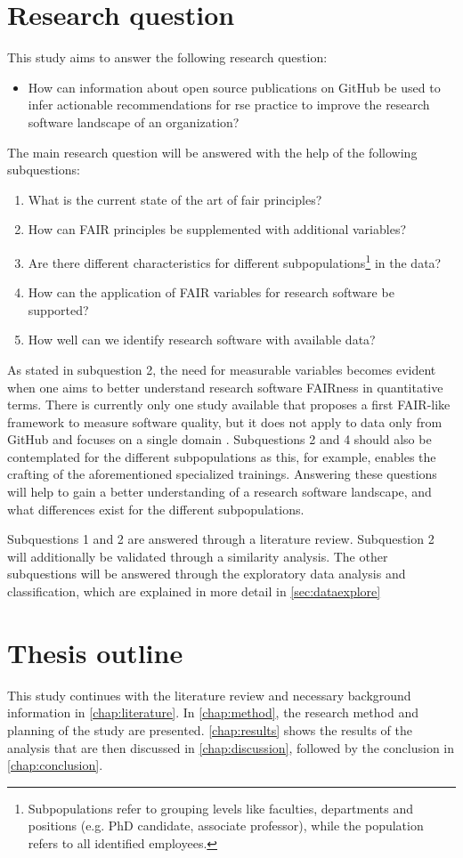 \section{Research question}
This study aims to answer the following research question: 
\begin{itemize}
    \item How can information about open source publications on GitHub be used to infer actionable recommendations for \acrshort{rse} practice to improve the research software landscape of an organization? 
\end{itemize}
The main research question will be answered with the help of the following subquestions:
\begin{enumerate}
  \item What is the current state of the art of \acrshort{fair} principles?
  \item How can FAIR principles be supplemented with additional variables?  
  \item Are there different characteristics for different subpopulations\footnote{Subpopulations refer to grouping levels like faculties, departments and positions (e.g. PhD candidate, associate professor), while the population refers to all identified employees.} in the data?
  \item How can the application of FAIR variables for research software be supported?
  \item How well can we identify research software with available data?
\end{enumerate}
As stated in subquestion 2, the need for measurable variables becomes evident when one aims to better understand research software FAIRness in quantitative terms. There is currently only one study available that proposes a first FAIR-like framework to measure software quality, but it does not apply to data only from GitHub and focuses on a single domain \cite{pico_fairsoft_2022}. Subquestions 2 and 4 should also be contemplated for the different subpopulations as this, for example, enables the crafting of the aforementioned specialized trainings. Answering these questions will help to gain a better understanding of a research software landscape, and what differences exist for the different subpopulations.

Subquestions 1 and 2 are answered through a literature review. Subquestion 2 will additionally be validated through a similarity analysis. The other subquestions will be answered through the exploratory data analysis and classification, which are explained in more detail in \autoref{sec:dataexplore}


\section{Thesis outline}
This study continues with the literature review and necessary background information in \autoref{chap:literature}. In \autoref{chap:method}, the research method and planning of the study are presented. \autoref{chap:results} shows the results of the analysis that are then discussed in \autoref{chap:discussion}, followed by the conclusion in \autoref{chap:conclusion}.